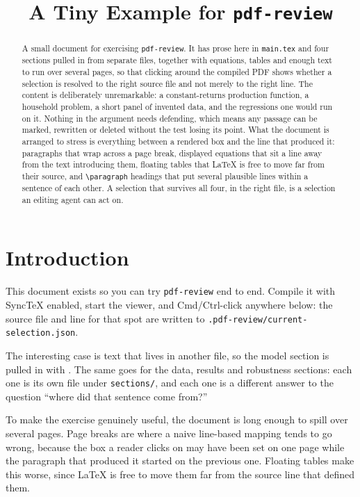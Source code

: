 \documentclass[11pt]{article}
\title{A Tiny Example for \texttt{pdf-review}}
\author{}
\date{}
\begin{document}
\maketitle

\begin{abstract}
A small document for exercising \texttt{pdf-review}. It has prose here in
\texttt{main.tex} and four sections pulled in from separate files, together with
equations, tables and enough text to run over several pages, so that clicking
around the compiled PDF shows whether a selection is resolved to the right source
file and not merely to the right line. The content is deliberately unremarkable:
a constant-returns production function, a household problem, a short panel of
invented data, and the regressions one would run on it. Nothing in the argument
needs defending, which means any passage can be marked, rewritten or deleted
without the test losing its point. What the document is arranged to stress is
everything between a rendered box and the line that produced it: paragraphs that
wrap across a page break, displayed equations that sit a line away from the text
introducing them, floating tables that \LaTeX{} is free to move far from their
source, and \verb|\paragraph| headings that put several plausible lines within a
sentence of each other. A selection that survives all four, in the right file,
is a selection an editing agent can act on.
\end{abstract}

\section{Introduction}

This document exists so you can try \texttt{pdf-review} end to end. Compile it
with SyncTeX enabled, start the viewer, and Cmd/Ctrl-click anywhere below: the
source file and line for that spot are written to
\texttt{.pdf-review/current-selection.json}.

The interesting case is text that lives in another file, so the model section is
pulled in with \verb||. The same goes for the data, results and robustness
sections: each one is its own file under \texttt{sections/}, and each one is a
different answer to the question ``where did that sentence come from?''

To make the exercise genuinely useful, the document is long enough to spill over
several pages. Page breaks are where a naive line-based mapping tends to go
wrong, because the box a reader clicks on may have been set on one page while
the paragraph that produced it started on the previous one. Floating tables make
this worse, since \LaTeX{} is free to move them far from the source line that
defined them.
\end{document}
